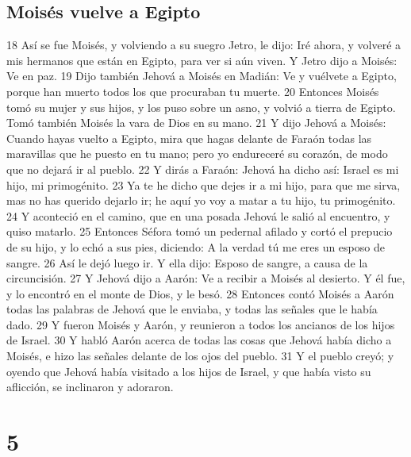 \section*{Moisés vuelve a Egipto}
18 Así se fue Moisés, y volviendo a su suegro Jetro, le dijo: Iré ahora, y volveré a mis hermanos que están en Egipto, para ver si aún viven. Y Jetro dijo a Moisés: Ve en paz.
19 Dijo también Jehová a Moisés en Madián: Ve y vuélvete a Egipto, porque han muerto todos los que procuraban tu muerte.
20 Entonces Moisés tomó su mujer y sus hijos, y los puso sobre un asno, y volvió a tierra de Egipto. Tomó también Moisés la vara de Dios en su mano.
21 Y dijo Jehová a Moisés: Cuando hayas vuelto a Egipto, mira que hagas delante de Faraón todas las maravillas que he puesto en tu mano; pero yo endureceré su corazón, de modo que no dejará ir al pueblo.
22 Y dirás a Faraón: Jehová ha dicho así: Israel es mi hijo, mi primogénito.
23 Ya te he dicho que dejes ir a mi hijo, para que me sirva, mas no has querido dejarlo ir; he aquí yo voy a matar a tu hijo, tu primogénito.
24 Y aconteció en el camino, que en una posada Jehová le salió al encuentro, y quiso matarlo.
25 Entonces Séfora tomó un pedernal afilado y cortó el prepucio de su hijo, y lo echó a sus pies, diciendo: A la verdad tú me eres un esposo de sangre.
26 Así le dejó luego ir. Y ella dijo: Esposo de sangre, a causa de la circuncisión.
27 Y Jehová dijo a Aarón: Ve a recibir a Moisés al desierto. Y él fue, y lo encontró en el monte de Dios, y le besó.
28 Entonces contó Moisés a Aarón todas las palabras de Jehová que le enviaba, y todas las señales que le había dado.
29 Y fueron Moisés y Aarón, y reunieron a todos los ancianos de los hijos de Israel.
30 Y habló Aarón acerca de todas las cosas que Jehová había dicho a Moisés, e hizo las señales delante de los ojos del pueblo.
31 Y el pueblo creyó; y oyendo que Jehová había visitado a los hijos de Israel, y que había visto su aflicción, se inclinaron y adoraron.

\chapter{5}

